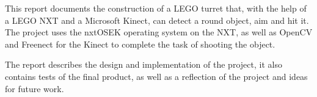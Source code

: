 This report documents the construction of a LEGO turret that, with the help of a LEGO NXT and a Microsoft Kinect, can detect a round object, aim and hit it. The project uses the nxtOSEK operating system on the NXT, as well as OpenCV and Freenect for the Kinect to complete the task of shooting the object.

The report describes the design and implementation of the project, it also contains tests of the final product, as well as a reflection of the project and ideas for future work.